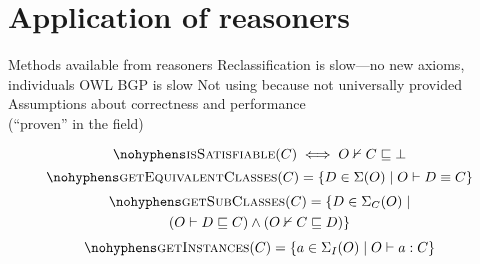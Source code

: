 \documentclass[paper.tex]{subfiles}
\begin{document}
\section{Application of reasoners}
\label{sec:reasoners}

\begin{todos}
  \todo Methods available from reasoners
  \todo Reclassification is slow---no new axioms, individuals
  \todo OWL BGP is slow
  \todo Not using  because not universally provided
  \todo Assumptions about correctness and performance \\(``proven'' in the field)
\end{todos}

\todo[in ontology $O$]

\[ \textproc{isSatisfiable}(C) \iff O \nsementails C \sqsubseteq \bot \]
\[ \textproc{getEquivalentClasses}(C) = \{ D \in \signature(O) \mid O \sementails D \equiv C \} \]
\begin{multline*}
  \textproc{getSubClasses}(C) =
  \{
    D \in \signature_C(O)
  \mid \\
    (O \sementails D \sqsubseteq C) \land (O \nsementails C \sqsubseteq D)
  \}
\end{multline*}
\[ \textproc{getInstances}(C) = \{ a \in \signature_I(O) \mid O \sementails a : C \} \]

\end{document}
